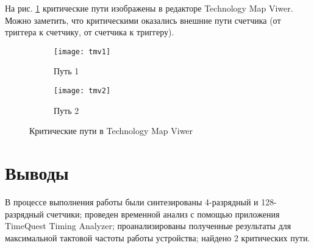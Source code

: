 \newpage

На рис. \ref{fig:tmv} критические пути изображены в редакторе Technology Map Viwer. Можно заметить, что критическими оказались внешние пути счетчика (от триггера к счетчику, от счетчика к триггеру).

\begin{figure}[H]
\begin{center}
	\begin{subfigure}[b]{\textwidth}
		\texttt{[image: tmv1]}
		\caption{Путь 1}
	\end{subfigure}
	\begin{subfigure}[b]{\textwidth}
		\texttt{[image: tmv2]}
		\caption{Путь 2}
	\end{subfigure}
	\caption{Критические пути в Technology Map Viwer}
	\label{fig:tmv}
\end{center}
\end{figure}

\section{Выводы}

В процессе выполнения работы были синтезированы 4-разрядный и 128-разрядный счетчики; проведен временной анализ с помощью приложения TimeQuest Timing Analyzer; проанализированы полученные результаты для максимальной тактовой частоты работы устройства; найдено 2 критических пути.

